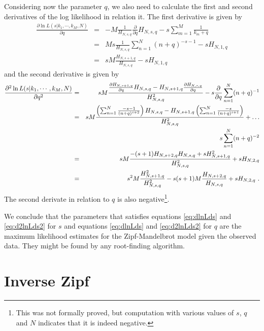 Considering now the parameter $q$, we also need to calculate the first and second derivatives of the log likelihood in relation it.
The first derivative is given by
\begin{eqnarray}
\label{eq:dlnLdq1}
\frac{\partial \ln L(s|k_1,\cdots,k_M,N)}{\partial q} &=& -M \frac{1}{H_{N,s,q}} \frac{\partial}{\partial q} H_{N,s,q} - s \sum_{m=1}^{M} \frac{1}{k_m+q} \nonumber \\
          &=& Ms \frac{1}{H_{N,s,q}} \sum_{n=1}^{N} (n+q)^{-s-1} - s H_{N,1,q} \nonumber \\
          &=& sM \frac{H_{N,s+1,q}}{H_{N,s,q}} - s H_{N,1,q}
\end{eqnarray}
and the second derivative is given by
\begin{eqnarray}
\label{eq:dlnLdq21}
\frac{\partial^2 \ln L(s|k_1,\cdots,k_M,N)}{\partial q^2} &=& sM \frac{ \frac{\partial H_{N,s+1,q}}{\partial q} H_{N,s,q} - H_{N,s+1,q} \frac{\partial H_{N,s,q}}{\partial q} }{H_{N,s,q}^2} - s \frac{\partial}{\partial q} \sum_{n=1}^{N} (n+q)^{-1} \nonumber \\
          &=& sM \frac{ \left( \sum_{n=1}^{N} \frac{-s-1}{(n+q)^{s+2}} \right) H_{N,s,q} - H_{N,s+1,q}  \left( \sum_{n=1}^{N} \frac{-s}{(n+q)^{s+1}} \right)   }{H_{N,s,q}^2} + \ldots \nonumber \\ 
          && s \sum_{n=1}^{N} (n+q)^{-2} \nonumber \\
          &=& sM \frac{-(s+1) H_{N,s+2,q} H_{N,s,q} + s H_{N,s+1,q}^2}{H_{N,s,q}^2} + s H_{N,2,q} \nonumber \\
          &=& s^2 M \frac{H_{N,s+1,q}^2}{H_{N,s,q}^2} - s(s+1)M \frac{H_{N,s+2,q}}{H_{N,s,q}} + s H_{N,2,q} \textmd{ .}
\end{eqnarray}
The second derivate in relation to $q$ is also negative\footnote{This was not formally proved, but computation with various values of $s$, $q$ and $N$
indicates that it is indeed negative.}.


We conclude that the parameters that satisfies equations \ref{eq:dlnLds} and \ref{eq:d2lnLds2} for $s$ and 
equations \ref{eq:dlnLds} and \ref{eq:d2lnLds2} for $q$ are the maximum likelihood estimates for the 
Zipf-Mandelbrot model given the observed data. They might be found by any root-finding algorithm.











%
%
%
%
\section{Inverse Zipf}

